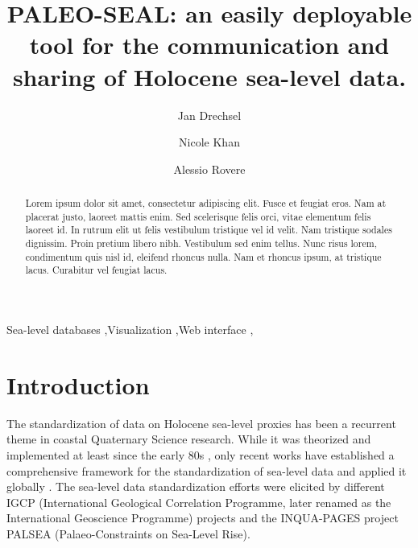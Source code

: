 \documentclass[a4paper,fleqn]{cas-dc}
\begin{document}
\let\WriteBookmarks\relax
\def\floatpagepagefraction{1}
\def\textpagefraction{.001}

\title [mode = title]{PALEO-SEAL: an easily deployable tool for the communication and sharing of Holocene sea-level data.}                      

\author[1]{Jan Drechsel}
\address[1]{MARUM, Center for Marine Environmental Sciences, University of Bremen, Germany}

\author[2]{Nicole Khan}
\address[2]{Department of Earth Sciences, University of Hong Kong, Hong Kong}

\author[1]{Alessio Rovere}
\cormark[1]

\begin{abstract}
Lorem ipsum dolor sit amet, consectetur adipiscing elit. Fusce et feugiat eros. Nam at placerat justo, laoreet mattis enim. Sed scelerisque felis orci, vitae elementum felis laoreet id. In rutrum elit ut felis vestibulum tristique vel id velit. Nam tristique sodales dignissim. Proin pretium libero nibh. Vestibulum sed enim tellus. Nunc risus lorem, condimentum quis nisl id, eleifend rhoncus nulla. Nam et rhoncus ipsum, at tristique lacus. Curabitur vel feugiat lacus.

\end{abstract}

\begin{keywords}
Sea-level databases \sep Visualization \sep Web interface \sep 
\end{keywords}

\maketitle

\section{Introduction}
The standardization of data on Holocene sea-level proxies has been a recurrent theme in coastal Quaternary Science research. While it was theorized and implemented at least since the early 80s \citep{shennan1982,shennan1983,VanDePlassche1986}, only recent works have established a comprehensive framework for the standardization of sea-level data and applied it globally \citep{khan2019}. The sea-level data standardization efforts were elicited by different IGCP (International Geological Correlation Programme, later renamed as the International Geoscience Programme) projects and the INQUA-PAGES project PALSEA (Palaeo-Constraints on Sea-Level Rise). 
\end{document}
